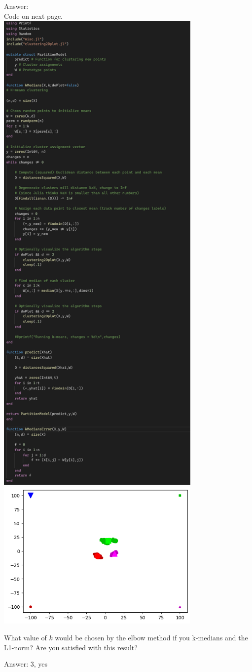 \documentclass{article}
\def\ans#1{\par\gre{Answer: #1}}
\def\gre#1{{\color{gre}#1}}
\begin{document}
{{\ans{\\Code on next page. \\ \includegraphics[width = 10cm]{q13Code.png} \\ \includegraphics[width=10cm]{q1Class.png}}
 \item What value of $k$ would be chosen by the elbow method if you k-medians and the L1-norm? Are you satisfied with this result?
\ans{3, yes}
 }}
\end{document}
